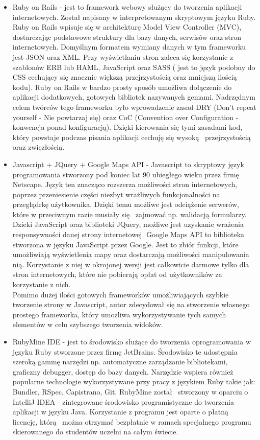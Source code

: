 \begin{itemize}
\item Ruby on Rails - jest to framework webowy służący do tworzenia aplikacji internetowych. Został napisany w interpretowanym skryptowym języku Ruby. Ruby on Rails wpisuje się w architekturę Model View Controller (MVC), dostarczając podstawowe struktury dla bazy danych, serwisów oraz stron internetowych. Domyślnym formatem wymiany danych w tym frameworku jest JSON oraz XML. Przy wyświetlaniu stron zaleca się korzystanie z szablonów ERB lub HAML, JavaScript oraz SASS ( jest to język podobny do CSS cechujący się znacznie większą przejrzystością oraz mniejszą ilością kodu). Ruby on Rails w bardzo prosty sposób umożliwa dołączenie do aplikacji dodatkowych, gotowych bibliotek nazywanych gemami. Nadrzędnym celem twórców tego frameworku było wprowadzenie zasad DRY (Don't repeat yourself - Nie powtarzaj się) oraz CoC (Convention over Configuration - konwencja ponad konfiguracją). Dzięki kierowania się tymi zasadami kod, który powstaje podczas pisania aplikacji cechuję się wysoką  przejrzystością oraz zwięzłością.\cite{rails}
\item Javascript + JQuery + Google Maps API - Javascript to skryptowy język programowania stworzony pod koniec lat 90 ubiegłego wieku przez firmę Netscape. Język ten znacząco rozszerza możliwości stron internetowych, poprzez przeniesienie części niezbyt wrażliwych funkcjonalności na przeglądrkę użytkownika. Dzięki temu możliwe jest odciążenie serwerów, które w przeciwnym razie musiały się  zajmować np. walidacją formularzy. Dzieki JavaScript oraz biblioteki JQuery, możliwe jest uzyskanie wrażenia responsywności danej strony internetowej. 
Google Maps API to biblioteka stworzona w języku JavaScript przez Google. Jest to zbiór funkcji, które umożliwiają wyświetlenia mapy oraz dostarczają możliwości manipulowania nią. Korzystanie z niej w okrojonej wersji jest całkowicie darmowe tylko dla stron internetowych, które nie pobierają opłat od użytkowników za korzystanie z nich.\\
 Pomimo dużej ilości gotowych frameworków umożliwiających szybkie tworzenie strony w Javascript, autor zdecydował się na stworzenie własnego prostego frameworka, który umożliwa wykorzystywanie tych samych elementów w celu szybszego tworzenia widoków.
\item RubyMine IDE - jest to środowisko służące do tworzenia oprogramowania w języku Ruby stworzone przez firmę JetBrains. Środowisko te udostępnia szeroką gammę narzędzi np. automatyczne zarządzanie bibliotekami, graficzny debugger, dostęp do bazy danych. Narzędzie wspiera również popularne technologie wykorzystywane przy pracy z językiem Ruby takie jak: Bundler, RSpec, Capistrano, Git. RubyMine został  stworzony w oparciu o IntelliJ IDEA - zintegrowane środowisko programistyczne do tworzenia aplikacji w języku Java. Korzystanie z programu jest oparte o płatną  licencję, którą  można otrzymać bezpłatnie w ramach specjalnego programu skierowanego do studentów uczelni na całym świecie.
\end{itemize}


